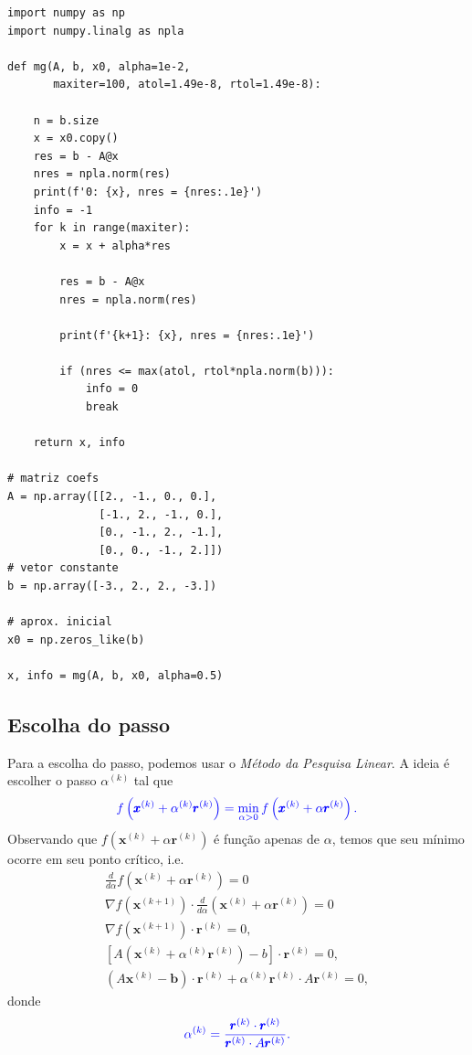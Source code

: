 \begin{ex}
\begin{lstlisting}[caption = mg.py, label=cap_sislin_sec_metg:cod:mg.py]
import numpy as np
import numpy.linalg as npla

def mg(A, b, x0, alpha=1e-2,
       maxiter=100, atol=1.49e-8, rtol=1.49e-8):
    
    n = b.size
    x = x0.copy()
    res = b - A@x
    nres = npla.norm(res)
    print(f'0: {x}, nres = {nres:.1e}')
    info = -1
    for k in range(maxiter):
        x = x + alpha*res
        
        res = b - A@x
        nres = npla.norm(res)

        print(f'{k+1}: {x}, nres = {nres:.1e}')

        if (nres <= max(atol, rtol*npla.norm(b))):
            info = 0
            break

    return x, info
            
# matriz coefs
A = np.array([[2., -1., 0., 0.],
              [-1., 2., -1., 0.],
              [0., -1., 2., -1.],
              [0., 0., -1., 2.]])
# vetor constante
b = np.array([-3., 2., 2., -3.])

# aprox. inicial
x0 = np.zeros_like(b)

x, info = mg(A, b, x0, alpha=0.5)
\end{lstlisting}
\end{ex}

\subsection{Escolha do passo}

Para a escolha do passo, podemos usar o \emph{Método da Pesquisa Linear}. A ideia é escolher o passo $\alpha^{(k)}$ tal que
\begin{equation}\color{blue}f\left(\pmb{x}^{(k)}+\alpha^{(k)}\pmb{r}^{(k)}\right) = \min_{\alpha > 0} f\left(\pmb{x}^{(k)}+\alpha\pmb{r}^{(k)}\right).
\end{equation}
Observando que $f(\pmb{x}^{(k)}+\alpha\pmb{r}^{(k)})$ é função apenas de $\alpha$, temos que seu mínimo ocorre em seu ponto crítico, i.e.
\begin{gather}
  \frac{d}{d\alpha}f\left(\pmb{x}^{(k)}+\alpha \pmb{r}^{(k)}\right) = 0 \\
  \nabla f\left(\pmb{x}^{(k+1)}\right)\cdot \frac{d}{d\alpha}\left(\pmb{x}^{(k)}+\alpha \pmb{r}^{(k)}\right) = 0 \\
  \nabla f(\pmb{x}^{(k+1)})\cdot \pmb{r}^{(k)} = 0,\\
  \left[A\left(\pmb{x}^{(k)}+\alpha^{(k)}\pmb{r}^{(k)}\right)-b\right]\cdot\pmb{r}^{(k)} = 0,\\
 \left(A\pmb{x}^{(k)}-\pmb{b}\right)\cdot\pmb{r}^{(k)}+\alpha^{(k)}\pmb{r}^{(k)}\cdot A\pmb{r}^{(k)} = 0,
\end{gather}
donde
\begin{equation}\label{cap_sislin_sec_metg:eq:mg_pl}\color{blue}\alpha^{(k)} = \frac{\pmb{r}^{(k)}\cdot\pmb{r}^{(k)}}{\pmb{r}^{(k)}\cdot A\pmb{r}^{(k)}}.
\end{equation}

